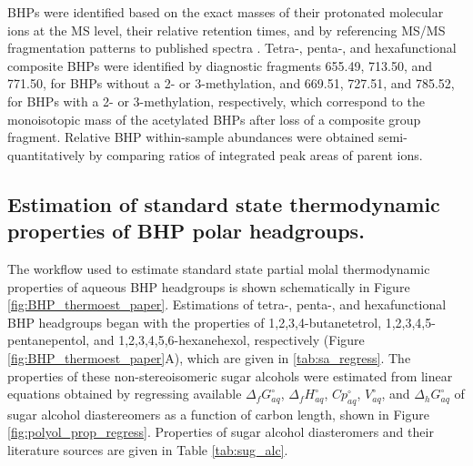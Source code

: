 BHPs were identified based on the exact masses of their protonated molecular ions at the MS level, their relative retention times, and by referencing MS/MS fragmentation patterns to published spectra \citep{talbot2005bacteriohopanepolyols, talbot2007rapid, talbot2007structural, talbot2003atmospheric, talbot2003characteristic, talbot2008cyanobacterial}. Tetra-, penta-, and hexafunctional composite BHPs were identified by diagnostic fragments 655.49, 713.50, and 771.50, for BHPs without a 2- or 3-methylation, and 669.51, 727.51, and 785.52, for BHPs with a 2- or 3-methylation, respectively, which correspond to the monoisotopic mass of the acetylated BHPs after loss of a composite group fragment. Relative BHP within-sample abundances were obtained semi-quantitatively by comparing ratios of integrated peak areas of parent ions.

\subsection{Estimation of standard state thermodynamic properties of BHP polar headgroups.}
The workflow used to estimate standard state partial molal thermodynamic properties of aqueous BHP headgroups is shown schematically in Figure \ref{fig:BHP_thermoest_paper}. Estimations of tetra-, penta-, and hexafunctional BHP headgroups began with the properties of 1,2,3,4-butanetetrol, 1,2,3,4,5-pentanepentol, and 1,2,3,4,5,6-hexanehexol, respectively (Figure \ref{fig:BHP_thermoest_paper}A), which are given in \ref{tab:sa_regress}. The properties of these non-stereoisomeric sugar alcohols were estimated from linear equations obtained by regressing available $\Delta_{f}G^{\circ}_{aq}$, $\Delta_{f}H^{\circ}_{aq}$, $Cp^{\circ}_{aq}$, $V^{\circ}_{aq}$, and $\Delta_{h}G^{\circ}_{aq}$ of sugar alcohol diastereomers as a function of carbon length, shown in Figure \ref{fig:polyol_prop_regress}. Properties of sugar alcohol diasteromers and their literature sources are given in Table \ref{tab:sug_alc}.

